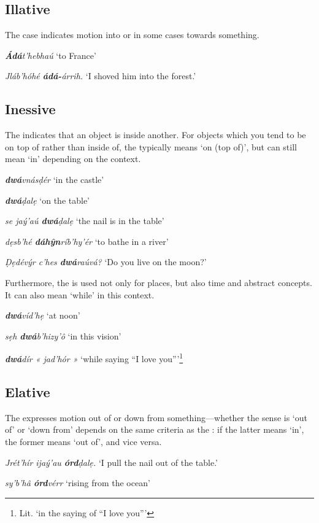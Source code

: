 \documentclass[a4paper, 12pt, twoside, openright, final]{book}
\def \b {ḅ}
\let \w \textit
\let \b \textbf
\begin{document}
\subsection{Illative}
The  case indicates motion into or in some cases towards something.
\begin{examples}
    \item \w{\b{Ádá}t’hebhaú} ‘to France’
    \item \w{Jláb’hóhé \b{ádá-}árrih.} ‘I shoved him into the forest.’
\end{examples}

\subsection{Inessive}
The  indicates that an object is inside another. For objects which you tend to be on top of rather than inside
of, the  typically means ‘on (top of)’, but can still mean ‘in’ depending on the context.
\begin{examples}
    \item \w{\b{dwá}vnásḍér} ‘in the castle’
    \item \w{\b{dwá}ḍalẹ} ‘on the table’
    \item \w{se jaý’aú \b{dwá}ḍalẹ} ‘the nail is in the table’
    \item \w{dẹsb’hé \b{dáhŷn}ríb’hy’ér} ‘to bathe in a river’
    \item \w{Ḍẹdévýr c’hes \b{dwá}raúvá?} ‘Do you live on the moon?’
\end{examples}

Furthermore, the  is used not only for places, but also time and abstract concepts. It can also mean
‘while’ in this context.
\begin{examples}
    \item \w{\b{dwá}víd’hẹ} ‘at noon’
    \item \w{sẹh \b{dwá}b’hizy’ô} ‘in this vision’
    \item \w{\b{dwá}dír « jad’hór »} ‘while saying “I love you”’\footnote{Lit. ‘in the saying of “I love you”’}
\end{examples}

\subsection{Elative}
The  expresses motion out of or down from something—whether the sense is ‘out of’ or ‘down from’ depends on the
same criteria as the : if the latter means ‘in’, the former means ‘out of’, and vice versa.
\begin{examples}
    \item \w{Jrét’hír ijaý’au \b{órd}ḍalẹ.} ‘I pull the nail out of the table.’
    \item \w{sy’b’hâ \b{órd}vérr} ‘rising from the ocean’
\end{examples}
\end{document}
